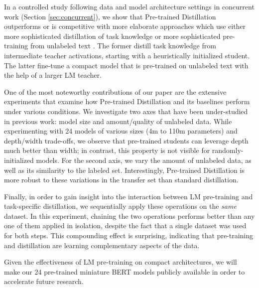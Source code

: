 In a controlled study following data and model architecture settings in concurrent work (Section \ref{sec:concurrent}), we show that Pre-trained Distillation outperforms or is competitive with more elaborate approaches which use either more sophisticated  distillation of task knowledge \citep{patient_kd} or more sophisticated pre-training from unlabeled text \citep{distil_bert}. The former distill task knowledge from intermediate teacher activations, starting with a heuristically initialized student. The latter  fine-tune a compact model that is pre-trained on unlabeled text with the help of a larger LM teacher.

One of the most noteworthy contributions of our paper are the extensive experiments that examine how Pre-trained Distillation and its baselines perform under various conditions. We investigate two axes that have been under-studied in previous work: model size and amount/quality of unlabeled data. While experimenting with 24 models of various sizes (4m to 110m parameters) and depth/width trade-offs, we observe that pre-trained students can leverage depth much better than width; in contrast, this property is not visible for randomly-initialized models. For the second axis, we vary the amount of unlabeled data, as well as its similarity to the labeled set. Interestingly, Pre-trained Distillation is more robust to these variations in the transfer set than standard distillation.

Finally, in order to gain insight into the interaction between LM pre-training and task-specific distillation, we sequentially apply these operations on the \emph{same} dataset. In this experiment, chaining the two operations performs better than any one of them applied in isolation, despite the fact that a single dataset was used for both steps. This compounding effect is surprising, indicating that pre-training and distillation are learning complementary aspects of the data.

Given the effectiveness of LM pre-training on compact architectures, we will make our 24 pre-trained miniature BERT models publicly available in order to accelerate future research.
